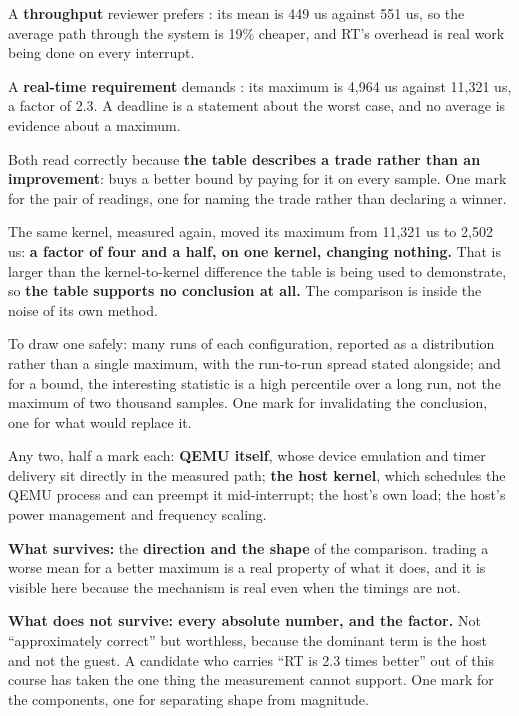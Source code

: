 A \textbf{throughput} reviewer prefers : its mean is 449 us against 551 us, so the
average path through the system is 19\% cheaper, and RT's overhead is real work being done on every
interrupt.

A \textbf{real-time requirement} demands : its maximum is 4,964 us against 11,321
us, a factor of 2.3. A deadline is a statement about the worst case, and no average is evidence
about a maximum.

Both read correctly because \textbf{the table describes a trade rather than an improvement}:
 buys a better bound by paying for it on every sample. One mark for the pair of
readings, one for naming the trade rather than declaring a winner.

The same kernel, measured again, moved its maximum from 11,321 us to 2,502 us: \textbf{a factor of
four and a half, on one kernel, changing nothing.} That is larger than the kernel-to-kernel difference the
table is being used to demonstrate, so \textbf{the table supports no conclusion at all.} The
comparison is inside the noise of its own method.

To draw one safely: many runs of each configuration, reported as a distribution rather than a single
maximum, with the run-to-run spread stated alongside; and for a bound, the interesting statistic is
a high percentile over a long run, not the maximum of two thousand samples. One mark for
invalidating the conclusion, one for what would replace it.

Any two, half a mark each: \textbf{QEMU itself}, whose device emulation and timer delivery sit
directly in the measured path; \textbf{the host kernel}, which schedules the QEMU process and can
preempt it mid-interrupt; the host's own load; the host's power management and frequency scaling.

\textbf{What survives:} the \textbf{direction and the shape} of the comparison. 
trading a worse mean for a better maximum is a real property of what it does, and it is visible here
because the mechanism is real even when the timings are not.

\textbf{What does not survive: every absolute number, and the factor.} Not ``approximately correct''
but worthless, because the dominant term is the host and not the guest. A candidate who carries ``RT
is 2.3 times better'' out of this course has taken the one thing the measurement cannot support. One
mark for the components, one for separating shape from magnitude.
